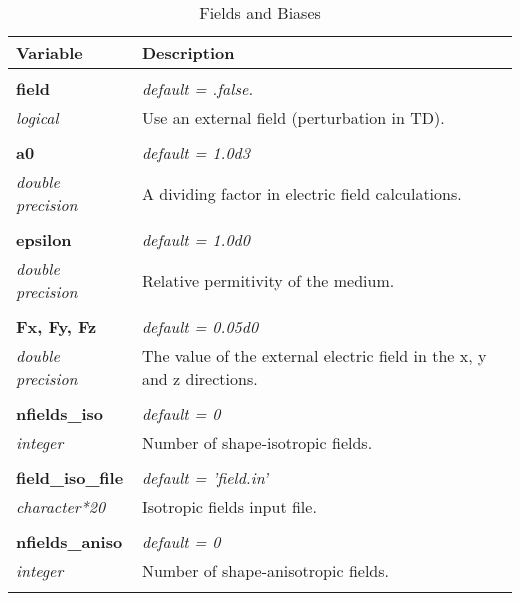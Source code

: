 \begin{Spacing}{1.0}
\begin{longtable}{ p{} p{} }

   \toprule
   \textbf{Variable} & Description \\*
   \midrule \\*
   \endhead

   \bottomrule
   \caption{Fields and Biases}
   \endfoot

   \textbf{field}
   &  \textit{default = .false. }
   \\*\textit{logical}
   & Use an external field (perturbation in TD).\\* \\

   \textbf{a0}
   &  \textit{default = 1.0d3}
   \\*\textit{double precision}
   & A dividing factor in electric field calculations.\\* \\

   \textbf{epsilon}
   &  \textit{default = 1.0d0}
   \\*\textit{double precision}
   & Relative permitivity of the medium.\\* \\

   \textbf{Fx, Fy, Fz}
   &  \textit{default = 0.05d0}
   \\*\textit{double precision}
   & The value of the external electric field in the
   x, y and z directions.\\* \\

   \textbf{nfields\_iso}
   &  \textit{default = 0}
   \\*\textit{integer}
   & Number of shape-isotropic fields. \\* \\

   \textbf{field\_iso\_file}
   &  \textit{default = 'field.in'}
   \\*\textit{character*20}
   & Isotropic fields input file.\\* \\

   \textbf{nfields\_aniso}
   &  \textit{default = 0}
   \\*\textit{integer}
   & Number of shape-anisotropic fields. \\* \\


\end{longtable}
\end{Spacing}

